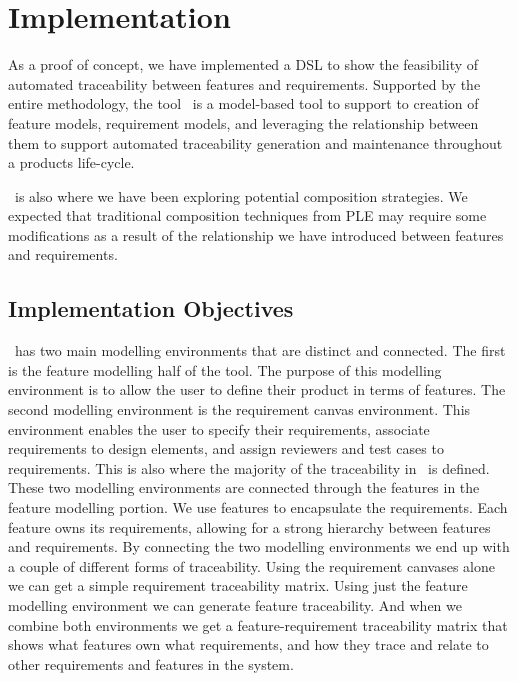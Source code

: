 \chapter{Implementation}

As a proof of concept, we have implemented a \ac{DSL} to show the feasibility of automated traceability between features and requirements. Supported by the entire methodology, the tool \tool\ is a model-based tool to support to creation of feature models, requirement models, and leveraging the relationship between them to support automated traceability generation and maintenance throughout a products life-cycle.

\tool\ is also where we have been exploring potential composition strategies. We expected that traditional composition techniques from \ac{PLE} may require some modifications as a result of the relationship we have introduced between features and requirements. 

\section{Implementation Objectives}

\tool\ has two main modelling environments that are distinct and connected. The first is the feature modelling half of the tool. The purpose of this modelling environment is to allow the user to define their product in terms of features. The second modelling environment is the requirement canvas environment. This environment enables the user to specify their requirements, associate requirements to design elements, and assign reviewers and test cases to requirements. This is also where the majority of the traceability in \tool\ is defined. These two modelling environments are connected through the features in the feature modelling portion. We use features to encapsulate the requirements. Each feature owns its requirements, allowing for a strong hierarchy between features and requirements. By connecting the two modelling environments we end up with a couple of different forms of traceability. Using the requirement canvases alone we can get a simple requirement traceability matrix. Using just the feature modelling environment we can generate feature traceability. And when we combine both environments we get a feature-requirement traceability matrix that shows what features own what requirements, and how they trace and relate to other requirements and features in the system. 

